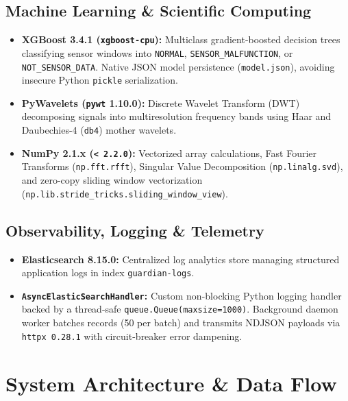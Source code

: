 \documentclass[10pt,a4paper]{report}
\begin{document}
\section{Machine Learning \& Scientific Computing}
\begin{itemize}[leftmargin=*]
  \item \textbf{XGBoost 3.4.1 (\texttt{xgboost-cpu}):} Multiclass gradient-boosted decision trees classifying sensor windows into \texttt{NORMAL}, \texttt{SENSOR\_MALFUNCTION}, or \texttt{NOT\_SENSOR\_DATA}. Native JSON model persistence (\texttt{model.json}), avoiding insecure Python \texttt{pickle} serialization.
  \item \textbf{PyWavelets (\texttt{pywt} 1.10.0):} Discrete Wavelet Transform (DWT) decomposing signals into multiresolution frequency bands using Haar and Daubechies-4 (\texttt{db4}) mother wavelets.
  \item \textbf{NumPy 2.1.x (\texttt{< 2.2.0}):} Vectorized array calculations, Fast Fourier Transforms (\lstinline{np.fft.rfft}), Singular Value Decomposition (\lstinline{np.linalg.svd}), and zero-copy sliding window vectorization (\lstinline{np.lib.stride_tricks.sliding_window_view}).
\end{itemize}

\section{Observability, Logging \& Telemetry}
\begin{itemize}[leftmargin=*]
  \item \textbf{Elasticsearch 8.15.0:} Centralized log analytics store managing structured application logs in index \texttt{guardian-logs}.
  \item \textbf{\texttt{AsyncElasticSearchHandler}:} Custom non-blocking Python logging handler backed by a thread-safe \lstinline{queue.Queue(maxsize=1000)}. Background daemon worker batches records (50 per batch) and transmits NDJSON payloads via \texttt{httpx 0.28.1} with circuit-breaker error dampening.
\end{itemize}

\chapter{System Architecture \& Data Flow}
\end{document}
